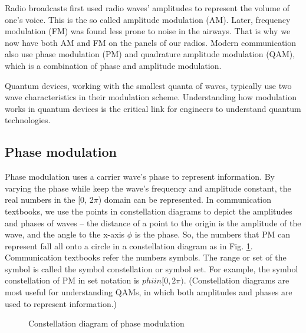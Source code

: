 \documentclass{book}
\begin{document}
Radio broadcasts first used radio waves' amplitudes to represent the volume of one's voice. This is the so called amplitude modulation (AM). Later, frequency modulation (FM) was found less prone to noise in the airways. That is why we now have both AM and FM on the panels of our radios. Modern communication also use phase modulation (PM) and quadrature amplitude modulation (QAM), which is a combination of phase and amplitude modulation.

Quantum devices, working with the smallest quanta of waves, typically use two wave characteristics in their modulation scheme. Understanding how modulation works in quantum devices is the critical link for engineers to understand quantum technologies.

\subsection{Phase modulation}
Phase modulation uses a carrier wave's phase to represent information. By varying the phase while keep the wave's frequency and amplitude constant, the real numbers in the [0, 2$\pi$) domain can be represented. In communication textbooks, we use the points in constellation diagrams to depict the amplitudes and phases of waves -- 
the distance of a point to the origin is the amplitude of the wave, and the angle to the x-axis $\phi$ is the phase. 
So, the numbers that PM can represent fall all onto a circle in a constellation diagram as in Fig. \ref{PM}. Communication textbooks refer the numbers symbols. The range or set of the symbol is called the symbol constellation or symbol set. For example, the symbol constellation of PM in set notation is $phi in [0, 2\pi)$.
(Constellation diagrams are most useful for understanding QAMs, in which both amplitudes and phases are used to represent information.)

\begin{figure}[ht]
\caption{Constellation diagram of phase modulation}
\label{PM}
\end{figure}
\end{document}
